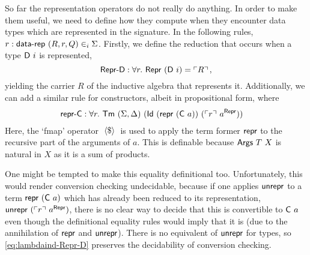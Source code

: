 So far the representation operators do not really do anything. In order to make
them useful, we need to define how they compute when they encounter data types
which are represented in the signature.
In the following rules, $r : \textsf{data-rep}\ (R, r, Q) \in_i \Sigma$.
Firstly, we define the reduction that occurs when a type $\textsf{D}\ i$ is represented,
\begin{equation}
  \mta{Repr-D} : \forall r.\ \MRepr\ (\mta{D}\ i) = \emb{R} \,, \label{eq:lambdaind-Repr-D}
\end{equation}
yielding the carrier $R$ of the inductive algebra that represents it.
Additionally, we can add a similar rule for constructors, albeit in propositional form, where
\begin{align*}
&\mta{repr-C} : \forall r.\ \Tm\ (\Sigma, \Delta)\ (\mta{Id}\ (\Mrepr\ (\mta{C}\ a))\ (\emb{r}\ a^\mta{Repr}))
\end{align*}
Here, the `fmap' operator $\;\langle\$\rangle\;$ is used to apply the term former $\textsf{repr}$
to the recursive part of the arguments of $a$. This is definable because
$\mta{Args}\ T\ X$ is natural in $X$ as it is a sum of products.

One might be tempted to make this equality definitional too. Unfortunately, this
would render conversion checking undecidable, because if one applies
$\textsf{unrepr}$ to a term $\textsf{repr}\ (\textsf{C}\ a)$ which has already been reduced
to its representation, $\textsf{unrepr}\ (\ulcorner r \urcorner\ a^{\textsf{Repr}})$, there is no
clear way to decide that this is convertible to $\textsf{C}\ a$ even though the
definitional equality rules would imply that it is (due
to the annihilation of $\textsf{repr}$ and $\textsf{unrepr}$). There is no
equivalent of $\textsf{unrepr}$ for types, so \eqref{eq:lambdaind-Repr-D} preserves
the decidability of conversion checking.


